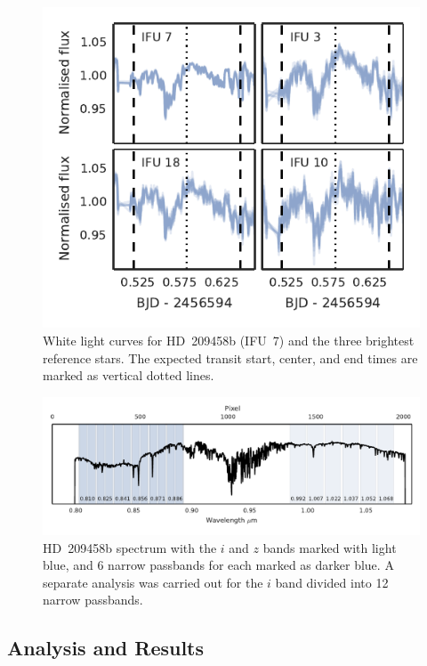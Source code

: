 \documentclass[useAMS,usenatbib]{mn2e}
\begin{document}
\begin{figure}
 \centering
 \includegraphics[width=\columnwidth]{hd_209458b_relative_fluxes.pdf}
 \caption{White light curves for HD~209458b (IFU~7) and the three brightest reference stars. The expected transit 
start, center, and end times are marked as vertical dotted lines.}
 \label{fig:hd_209458b_relative_fluxes}
\end{figure}

\begin{figure}
 \centering
 \includegraphics[width=\textwidth]{hd_209458b_spec_bins.pdf}
 \caption{HD~209458b spectrum with the $i$ and $z$ bands marked with light blue, and 6 narrow passbands for each marked as darker blue. 
  A separate analysis was carried out for the $i$ band divided into 12 narrow passbands.}
 \label{fig:hd_209458b_spectrum_bins}
\end{figure}

\subsection{Analysis and Results}
\label{sec:hd_209458:analysis}
\end{document}
